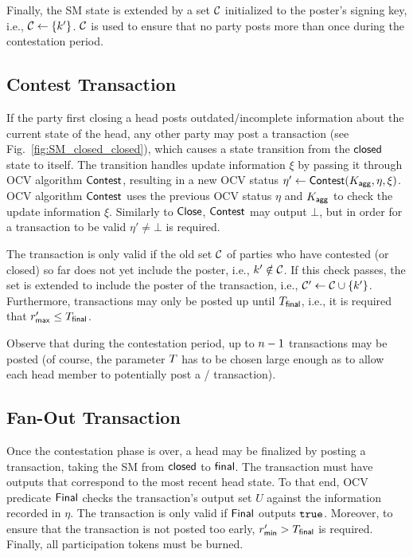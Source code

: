 Finally, the SM state is extended by a set $\mathcal C$
initialized to the poster's signing key, i.e.,
$\mathcal C \gets \{k'\}$.   $\mathcal C$ is used to ensure that no party
posts more than once during the contestation period.





\subsection{Contest Transaction} 

If the party first closing a head posts
outdated/incomplete information about the current state of the head,
any other party may post a \mtxContest{} transaction (see
Fig.~\ref{fig:SM_closed_closed}), which causes a state transition from
the $\mathsf{closed}$ state to itself.  The transition handles update
information $\xi$ by passing it through OCV algorithm $\mathsf{Contest}$,
resulting in a new OCV status
$\eta' \gets \mathsf{Contest} (K_{\mathsf{agg}},\eta,\xi)$.  OCV algorithm
$\mathsf{Contest}$ uses the previous OCV status $\eta$ and $K_{\mathsf{agg}}$ to check
the update information $\xi$.  Similarly to $\mathsf{Close}$, $\mathsf{Contest}$
may output $\bot$, but in order for a \mtxContest{} transaction to be
valid $\eta' \neq \bot$ is required.

The \mtxContest{} transaction is only valid if the old set
$\mathcal C$ of parties who have contested (or closed) so far does not yet
include the poster, i.e., $k' \notin \mathcal C$.  If this check
passes, the set is extended to include the poster of the \mtxContest{}
transaction, i.e., $\mathcal C' \gets \mathcal C \cup \{k'\}$.
Furthermore, \mtxContest{} transactions may only be posted up until
$T_{\mathsf{final}}$, i.e., it is required that $r_{\mathsf{max}}' \leq T_{\mathsf{final}}$.

Observe that during the contestation period, up to $n-1$
\mtxContest{} transactions may be posted (of course, the parameter
$T$ has to be chosen large enough as to allow each head member to
potentially post a \mtxClose{}/\mtxContest{} transaction).






\subsection{Fan-Out Transaction}  

Once the contestation phase is over, a head
may be finalized by posting a \mtxFanout{} transaction, taking the SM
from $\mathsf{closed}$ to $\mathsf{final}$.  The \mtxFanout{} transaction must
have outputs that correspond to the most recent head state.  To that
end, OCV predicate $\mathsf{Final}$ checks the transaction's output set $U$
against the information recorded in $\eta$.  The \mtxFanout{}
transaction is only valid if $\mathsf{Final}$ outputs $\mathtt{true}$.  Moreover,
to ensure that the \mtxFanout{} transaction is not posted too early,
$r_{\mathsf{min}}' > T_{\mathsf{final}}$ is required.  Finally, all participation tokens
must be burned.


